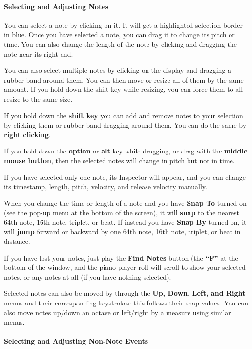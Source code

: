 \documentclass[twoside,10pt]{article}
\begin{document}
\paragraph{Selecting and Adjusting Notes}

You can select a note by clicking on it.  It will get a highlighted selection border in blue.  Once you have selected a note, you can drag it to change its pitch or time.  You can also change the length of the note by clicking and dragging the note near its right end.

You can also select multiple notes by clicking on the display and dragging a rubber-band around them.  You can then move or resize all of them by the same amount.  If you hold down the shift key while resizing, you can force them to all resize to the same size.

If you hold down the {\bf shift key} you can add and remove notes to your selection by clicking them or rubber-band dragging around them.  You can do the same by {\bf right clicking}.

If you hold down the {\bf option} or {\bf alt} key while dragging, or drag with the {\bf middle mouse button}, then the selected notes will change in pitch but not in time.

If you have selected only one note, its Inspector will appear, and you can change its timestamp, length, pitch, velocity, and release velocity manually.

When you change the time or length of a note and you have {\bf Snap To} turned on (see the pop-up menu at the bottom of the screen), it will {\bf snap} to the nearest 64th note, 16th note, triplet, or beat.  If instead you have {\bf Snap By} turned on, it will {\bf jump} forward or backward by one 64th note, 16th note, triplet, or beat in distance.

If you have lost your notes, just play the {\bf Find Notes} button (the {\bf ``F''} at the bottom of the window, and the piano player roll will scroll to show your selected notes, or any notes at all (if you have nothing selected).

Selected notes can also be moved by through the {\bf Up, Down, Left, and Right} menus and their corresponding keystrokes: this follows their snap values.  You can also move notes up/down an octave or left/right by a measure using similar menus.

\paragraph{Selecting and Adjusting Non-Note Events}
\end{document}
